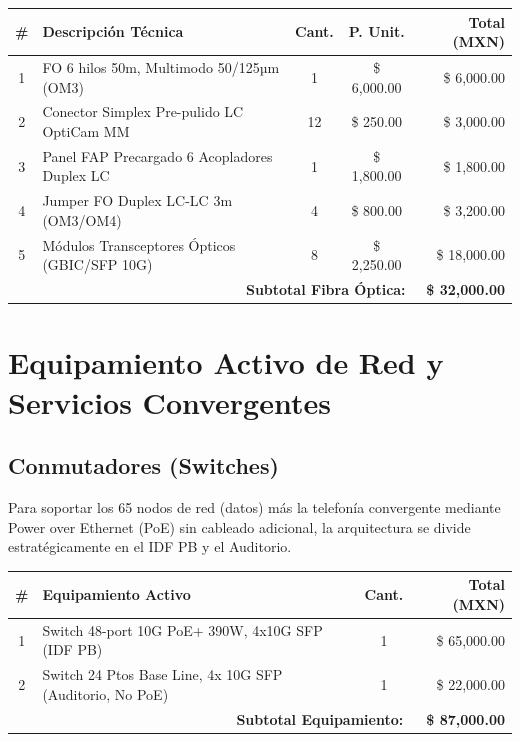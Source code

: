 \documentclass[11pt, letterpaper]{article}
\begin{document}
\begin{table}[h!]
\centering
{}
\renewcommand{\arraystretch}{1.3}
\begin{tabularx}{\textwidth}{@{} c X c c r @{}}
\toprule
\rowcolor{OroUNAM!20}
\textbf{\#} & \textbf{Descripción Técnica} & \textbf{Cant.} & \textbf{P. Unit.} & \textbf{Total (MXN)} \\ \midrule
1 & FO 6 hilos 50m, Multimodo 50/125µm (OM3) & 1 & \$ 6,000.00 & \$ 6,000.00 \\
2 & Conector Simplex Pre-pulido LC OptiCam MM & 12 & \$ 250.00 & \$ 3,000.00 \\
3 & Panel FAP Precargado 6 Acopladores Duplex LC & 1 & \$ 1,800.00 & \$ 1,800.00 \\
4 & Jumper FO Duplex LC-LC 3m (OM3/OM4) & 4 & \$ 800.00 & \$ 3,200.00 \\
5 & Módulos Transceptores Ópticos (GBIC/SFP 10G) & 8 & \$ 2,250.00 & \$ 18,000.00 \\ \midrule
\multicolumn{4}{r}{\textbf{Subtotal Fibra Óptica:}} & \textbf{\textcolor{AzulUNAM}{\$ 32,000.00}} \\ \bottomrule
\end{tabularx}
\end{table}

\section{Equipamiento Activo de Red y Servicios Convergentes}

\subsection{Conmutadores (Switches)}
Para soportar los 65 nodos de red (datos) más la telefonía convergente mediante Power over Ethernet (PoE) sin cableado adicional, la arquitectura se divide estratégicamente en el IDF PB y el Auditorio.

\begin{table}[h!]
\centering
{}
\renewcommand{\arraystretch}{1.3}
\begin{tabularx}{\textwidth}{@{} c X c r @{}}
\toprule
\rowcolor{OroUNAM!20}
\textbf{\#} & \textbf{Equipamiento Activo} & \textbf{Cant.} & \textbf{Total (MXN)} \\ \midrule
1 & Switch 48-port 10G PoE+ 390W, 4x10G SFP (IDF PB) & 1 & \$ 65,000.00 \\
2 & Switch 24 Ptos Base Line, 4x 10G SFP (Auditorio, No PoE) & 1 & \$ 22,000.00 \\ \midrule
\multicolumn{3}{r}{\textbf{Subtotal Equipamiento:}} & \textbf{\textcolor{AzulUNAM}{\$ 87,000.00}} \\ \bottomrule
\end{tabularx}
\end{table}
\end{document}
